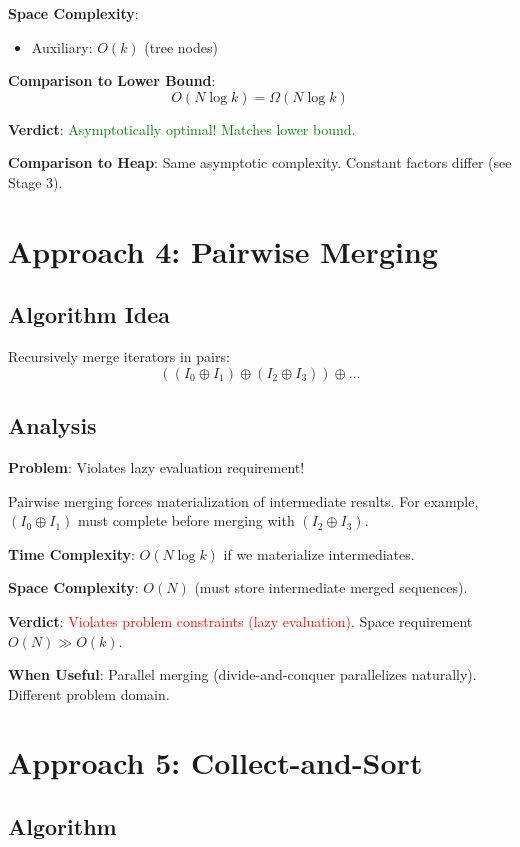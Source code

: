 \documentclass[11pt]{article}
\begin{document}
\textbf{Space Complexity}:
\begin{itemize}
    \item Auxiliary: $O(k)$ (tree nodes)
\end{itemize}

\textbf{Comparison to Lower Bound}:
\[
O(N \log k) = \Omega(N \log k)
\]

\textbf{Verdict}: \textcolor{green}{Asymptotically optimal! Matches lower bound.}

\textbf{Comparison to Heap}: Same asymptotic complexity. Constant factors differ (see Stage 3).

\section{Approach 4: Pairwise Merging}

\subsection{Algorithm Idea}

Recursively merge iterators in pairs:
\[
((I_0 \oplus I_1) \oplus (I_2 \oplus I_3)) \oplus \ldots
\]

\subsection{Analysis}

\textbf{Problem}: Violates lazy evaluation requirement!

Pairwise merging forces materialization of intermediate results. For example, $(I_0 \oplus I_1)$ must complete before merging with $(I_2 \oplus I_3)$.

\textbf{Time Complexity}: $O(N \log k)$ if we materialize intermediates.

\textbf{Space Complexity}: $O(N)$ (must store intermediate merged sequences).

\textbf{Verdict}: \textcolor{red}{Violates problem constraints (lazy evaluation)}. Space requirement $O(N) \gg O(k)$.

\textbf{When Useful}: Parallel merging (divide-and-conquer parallelizes naturally). Different problem domain.

\section{Approach 5: Collect-and-Sort}

\subsection{Algorithm}
\end{document}
